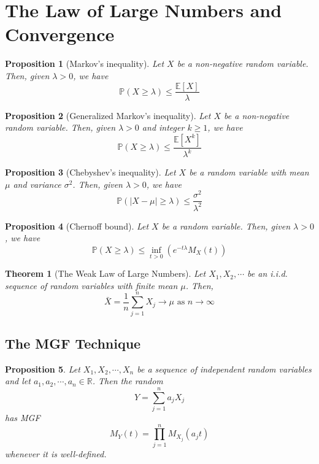 \documentclass[
]{article}
\newtheorem{theorem}{Theorem}[section]
\newtheorem{proposition}{Proposition}[section]
\theoremstyle{definition}
\theoremstyle{definition}
\theoremstyle{definition}
\theoremstyle{remark}
\newcommand{\prob}[1]{\mathbb{P}\left(#1\right)}
\newcommand{\R}{\mathbb{R}}
\newcommand{\E}[1]{\mathbb{E}[#1]}
\begin{document}
\section{The Law of Large Numbers and Convergence}

\begin{proposition} [Markov's inequality]
  Let $X$ be a non-negative random variable. Then, given $\lambda > 0$, we have
  \[\prob{X \geq \lambda} \leq \frac{\E{X}}{\lambda}\]
\end{proposition}

\begin{proposition} [Generalized Markov's inequality]
  Let $X$ be a non-negative random variable. Then, given $\lambda > 0$ and integer $k \geq 1$, we have
  \[\prob{X \geq \lambda} \leq \frac{\E{X^k}}{\lambda^k}\]
\end{proposition}

\begin{proposition} [Chebyshev's inequality]
  Let $X$ be a random variable with mean $\mu$ and variance $\sigma^2$. Then, given $\lambda > 0$, we have
  \[\prob{\left\lvert X - \mu\right\rvert \geq \lambda } \leq \frac{\sigma^2}{\lambda^2}\]
\end{proposition}

\begin{proposition} [Chernoff bound]
  Let $X$ be a random variable. Then, given $\lambda > 0$, we have
  \[\prob{X \geq \lambda} \leq \inf_{t > 0}(e^{-t\lambda}M_X(t))\]
\end{proposition}

\begin{theorem} [The Weak Law of Large Numbers]
  Let $X_1, X_2, \cdots$ be an i.i.d. sequence of random variables with finite mean $\mu$. Then,
  \[\bar{X} = \frac{1}{n} \sum_{j = 1}^{n}{X_j \rightarrow \mu} \text{ as } n \rightarrow \infty \]
\end{theorem}

\subsection{The MGF Technique}

\begin{proposition}
  Let $X_1, X_2, \cdots, X_n$ be a sequence of independent random variables and let $a_1, a_2, \cdots, a_n \in \R$. Then the random
  \[Y = \sum_{j = 1}^{n}{a_jX_j} \]
  has MGF
  \[M_Y(t) = \prod_{j = 1}^{n}{M_{X_j}(a_jt)}\]
  whenever it is well-defined.
\end{proposition}
\end{document}
